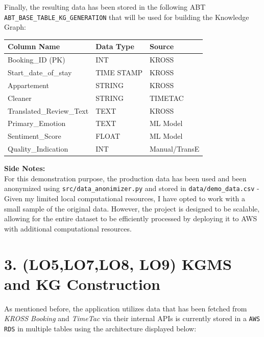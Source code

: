 \documentclass[
]{article}
\begin{document}
Finally, the resulting data has been stored in the following ABT
\texttt{ABT\_BASE\_TABLE\_KG\_GENERATION} that will be used for building
the Knowledge Graph:

\begin{longtable}[]{@{}
  >{\raggedright\arraybackslash}p{}
  >{\raggedright\arraybackslash}p{}
  >{\raggedright\arraybackslash}p{}@{}}\toprule\noalign{}
Column Name & Data Type & Source \\
\midrule\noalign{}
\endhead
\bottomrule\noalign{}
\endlastfoot
Booking\_ID (PK) & INT & KROSS \\
Start\_date\_of\_stay & TIME STAMP & KROSS \\
Appartement & STRING & KROSS \\
Cleaner & STRING & TIMETAC \\
Translated\_Review\_Text & TEXT & KROSS \\
Primary\_Emotion & TEXT & ML Model \\
Sentiment\_Score & FLOAT & ML Model \\
Quality\_Indication & INT & Manual/TransE \\
\end{longtable}

\textbf{Side Notes:} \\
For this demonstration purpose, the production
data has been used and been anonymized using
\texttt{src/data\_anonimizer.py} and stored in
\texttt{data/demo\_data.csv} - Given my limited local computational
resources, I have opted to work with a small sample of the original
data. However, the project is designed to be scalable, allowing for the
entire dataset to be efficiently processed by deploying it to AWS with
additional computational resources.

\pagebreak

\section{3. (LO5,LO7,LO8, LO9) KGMS and KG Construction}\label{kgms-and-kg-construction}
As mentioned before, the application utilizes data that has been fetched
from \emph{KROSS Booking} and \emph{TimeTac} via their internal APIs is
currently stored in a \texttt{AWS RDS} in multiple tables using the architecture
displayed below:
\end{document}
